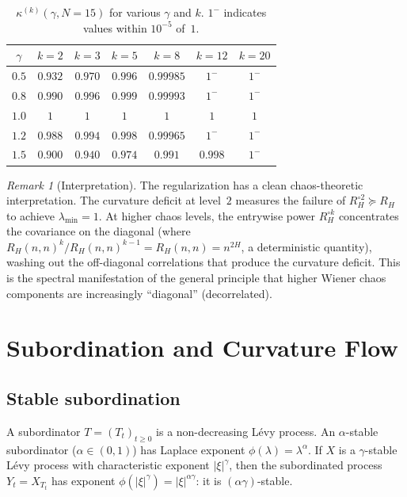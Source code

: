 \documentclass[11pt,a4paper]{article}
\theoremstyle{plain}
\theoremstyle{definition}
\theoremstyle{remark}
\newtheorem{remark}[theorem]{Remark}
\begin{document}
\begin{table}[ht]
\centering
\begin{tabular}{c|cccccc}
$\gamma$ & $k=2$ & $k=3$ & $k=5$ & $k=8$ & $k=12$ & $k=20$ \\
\hline
$0.5$ & $0.932$ & $0.970$ & $0.996$ & $0.99985$ & $1^-$ & $1^-$ \\
$0.8$ & $0.990$ & $0.996$ & $0.999$ & $0.99993$ & $1^-$ & $1^-$ \\
$1.0$ & $1$ & $1$ & $1$ & $1$ & $1$ & $1$ \\
$1.2$ & $0.988$ & $0.994$ & $0.998$ & $0.99965$ & $1^-$ & $1^-$ \\
$1.5$ & $0.900$ & $0.940$ & $0.974$ & $0.991$ & $0.998$ & $1^-$ \\
\end{tabular}
\caption{$\kappa^{(k)}(\gamma, N{=}15)$ for various $\gamma$ and $k$.
$1^-$ indicates values within $10^{-5}$ of~$1$.}
\label{tab:regularization}
\end{table}


\begin{remark}[Interpretation]\label{rem:regularization}
The regularization has a clean chaos-theoretic interpretation.
The curvature deficit at level~$2$ measures the failure of
$R_H^{\circ 2} \succeq R_H$ to achieve
$\lambda_{\min} = 1$.
At higher chaos levels, the entrywise power $R_H^{\circ k}$
concentrates the covariance on the diagonal (where
$R_H(n,n)^k / R_H(n,n)^{k-1} = R_H(n,n) = n^{2H}$, a
deterministic quantity), washing out the off-diagonal
correlations that produce the curvature deficit.
This is the spectral manifestation of the general principle
that higher Wiener chaos components are increasingly
``diagonal'' (decorrelated).
\end{remark}


\section{Subordination and Curvature Flow}\label{sec:subordination}

\subsection{Stable subordination}

A subordinator $T = (T_t)_{t \geq 0}$ is a non-decreasing
L\'evy process. An $\alpha$-stable subordinator
($\alpha \in (0,1)$) has Laplace exponent
$\phi(\lambda) = \lambda^\alpha$.
If $X$ is a $\gamma$-stable L\'evy process with
characteristic exponent $|\xi|^\gamma$, then the
subordinated process $Y_t = X_{T_t}$ has exponent
$\phi(|\xi|^\gamma) = |\xi|^{\alpha\gamma}$:
it is $(\alpha\gamma)$-stable.
\end{document}
